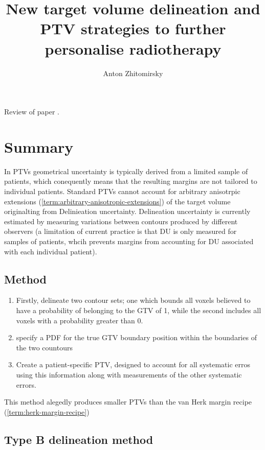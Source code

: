 \documentclass[11pt]{article}
\title{New target volume delineation and PTV strategies to further
personalise radiotherapy}
\author{Anton Zhitomirsky}
\begin{document}
\maketitle

Review of paper \cite{personalised-PTV-strategies}.

\section{Summary}

In PTVs geometrical uncertainty is typically derived from a limited sample of patients, which conequently means that the resulting margins are not tailored to individual patients. Standard PTVs cannot account for arbitrary anisotrpic extensions (\ref{term:arbitrary-anisotropic-extensions}) of the target volume originalting from Delinieation uncertainty. Delineation uncertainty is currently estimated by measuring variations between contours produced by different observers (a limitation of current practice is that DU is only measured for samples of patients, whcih prevents margins from accounting for DU associated with each individual patient).

\subsection{Method}

\begin{enumerate}
    \item Firstly, delineate two contour sets; one which bounds all voxels believed to have a probability of belonging to the GTV of 1, while the second includes all voxels with a probability greater than 0.
    \item specify a PDF for the true GTV boundary position within the boundaries of the two countours
    \item Create a patient-specific PTV, designed to account for all systematic erros using this information along with measurements of the other systematic errors.
\end{enumerate}

This method alegedly produces smaller PTVs than the van Herk margin recipe (\ref{term:herk-margin-recipe})

\subsection{Type B delineation method}
\end{document}
